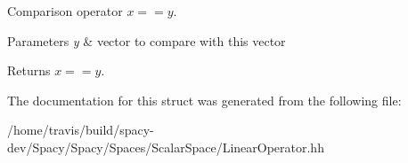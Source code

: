 \-Comparison operator $ x==y$. 


\begin{DoxyParams}{\-Parameters}
{\em y} & vector to compare with this vector \\
\hline
\end{DoxyParams}
\begin{DoxyReturn}{\-Returns}
$ x==y$. 
\end{DoxyReturn}


\-The documentation for this struct was generated from the following file\-:\begin{DoxyCompactItemize}
\item 
/home/travis/build/spacy-\/dev/\-Spacy/\-Spacy/\-Spaces/\-Scalar\-Space/\-Linear\-Operator.\-hh\end{DoxyCompactItemize}
